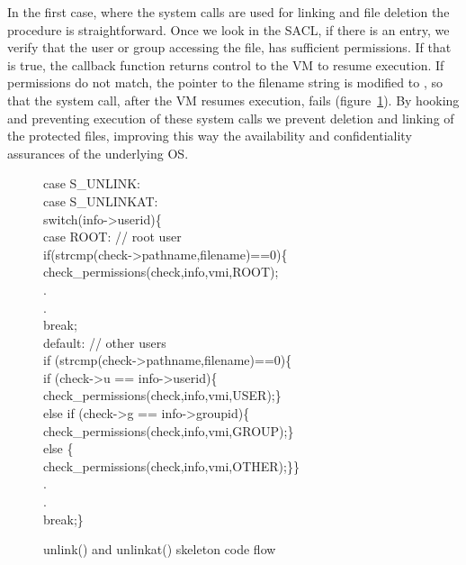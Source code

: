 \par In the first case, where the system calls are used for linking and file deletion the procedure is straightforward. Once we look in the \ac{SACL}, if there is an entry, we verify that the user or group accessing the file, has sufficient permissions. If that is true, the callback function returns control to the \ac{VM} to resume execution. If permissions do not match, the pointer to the filename string is modified to , so that the system call, after the \ac{VM} resumes execution, fails (figure~\ref{fig:unlink}). By hooking and preventing execution of these system calls we prevent deletion and linking of the protected files, improving this way the availability and confidentiality assurances of the underlying \ac{OS}.

\begin{figure}[ht]
\footnotesize {
	{\selectfont 
case S\_UNLINK:\\          
case S\_UNLINKAT:\\
\tab  switch(info->userid)\{\\
\tab \tab case ROOT: // root user\\
\tab \tab \tab 	if(strcmp(check->pathname,filename)==0)\{\\
\tab \tab \tab \tab 		check\_permissions(check,info,vmi,ROOT);\\			
\tab .\\
\tab .\\
\tab \tab \tab break;\\
\tab \tab default: // other users\\
\tab \tab \tab if (strcmp(check->pathname,filename)==0)\{\\
\tab \tab \tab \tab if (check->u == info->userid)\{\\
\tab \tab \tab \tab \tab check\_permissions(check,info,vmi,USER);\}\\
\tab \tab \tab \tab else if (check->g == info->groupid)\{\\
\tab \tab \tab \tab \tab check\_permissions(check,info,vmi,GROUP);\}\\
\tab \tab \tab else \{\\
\tab \tab \tab \tab check\_permissions(check,info,vmi,OTHER);\}\}\\
\tab .\\
\tab .\\
\tab \tab \tab break;\}}}
	\caption{unlink() and unlinkat() skeleton code flow}
	\label{fig:unlink}
\end{figure}


